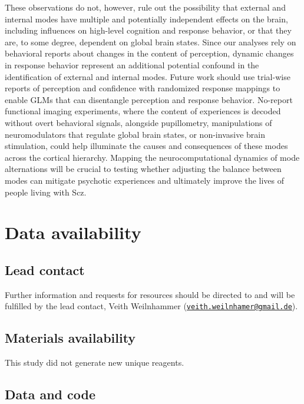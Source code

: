 \documentclass[
]{article}
\begin{document}
These observations do not, however, rule out the possibility that
external and internal modes have multiple and potentially independent
effects on the brain, including influences on high-level cognition and
response behavior, or that they are, to some degree, dependent on global
brain states. Since our analyses rely on behavioral reports about
changes in the content of perception, dynamic changes in response
behavior represent an additional potential confound in the
identification of external and internal modes. Future work should use
trial-wise reports of perception and confidence with randomized response
mappings to enable GLMs that can disentangle perception and response
behavior. No-report functional imaging experiments, where the content of
experiences is decoded without overt behavioral signals, alongside
pupillometry, manipulations of neuromodulators that regulate global
brain states, or non-invasive brain stimulation, could help illuminate
the causes and consequences of these modes across the cortical
hierarchy. Mapping the neurocomputational dynamics of mode alternations
will be crucial to testing whether adjusting the balance between modes
can mitigate psychotic experiences and ultimately improve the lives of
people living with Scz.

\section{Data availability}\label{data-availability}

\subsection{Lead contact}\label{lead-contact}

Further information and requests for resources should be directed to and
will be fulfilled by the lead contact, Veith Weilnhammer
(\href{mailto:veith.weilnhamer@gmail.de}{\nolinkurl{veith.weilnhamer@gmail.de}}).

\subsection{Materials availability}\label{materials-availability}

This study did not generate new unique reagents.

\subsection{Data and code}\label{data-and-code}
\end{document}

